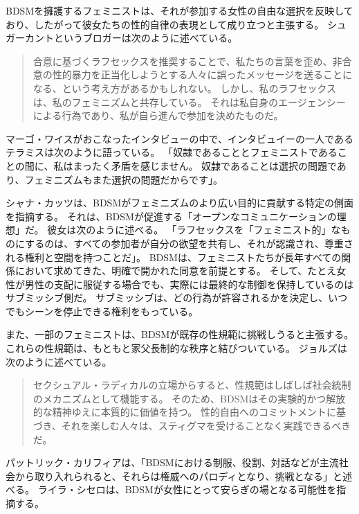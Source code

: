 \documentclass[paper=a4,book,openany]{jlreq} \usepackage{mystyle}
\begin{document}
BDSMを擁護するフェミニストは、それが参加する女性の自由な選択を反映しており、したがって彼女たちの性的自律の表現として成り立つと主張する。
シュガーカントというブロガーは次のように述べている。

\begin{quote}
合意に基づくラフセックスを推奨することで、私たちの言葉を歪め、非合意の性的暴力を正当化しようとする人々に誤ったメッセージを送ることになる、という考え方があるかもしれない。
しかし、私のラフセックスは、私のフェミニズムと共存している。
それは私自身のエージェンシーによる行為であり、私が自ら進んで参加を決めたものだ。
\citep{tallon-hicks16:_can_you_be_femin_like_rough_sex}

\end{quote}

マーゴ・ワイスがおこなったインタビューの中で、インタビュイーの一人であるテラミスは次のように語っている。
「奴隷であることとフェミニストであることの間に、私はまったく矛盾を感じません。
奴隷であることは選択の問題であり、フェミニズムもまた選択の問題だからです」\citep{weiss11:_techn_pleas}。

シャナ・カッツは、BDSMがフェミニズムのより広い目的に貢献する特定の側面を指摘する。
それは、BDSMが促進する「オープンなコミュニケーションの理想」だ。
彼女は次のように述べる。
「ラフセックスを「フェミニスト的」なものにするのは、すべての参加者が自分の欲望を共有し、それが認識され、尊重される権利と空間を持つことだ」\citep{tallon-hicks16:_can_you_be_femin_like_rough_sex}。
BDSMは、フェミニストたちが長年すべての関係において求めてきた、明確で開かれた同意を前提とする。
そして、たとえ女性が男性の支配に服従する場合でも、実際には最終的な制御を保持しているのはサブミッシブ側だ。
サブミッシブは、どの行為が許容されるかを決定し、いつでもシーンを停止できる権利をもっている。

また、一部のフェミニストは、BDSMが既存の性規範に挑戦しうると主張する。
これらの性規範は、もともと家父長制的な秩序と結びついている。
ジョルズは次のように述べている。

\begin{quote}
  セクシュアル・ラディカルの立場からすると、性規範はしばしば社会統制のメカニズムとして機能する。
そのため、BDSMはその実験的かつ解放的な精神ゆえに本質的に価値を持つ。
性的自由へのコミットメントに基づき、それを楽しむ人々は、スティグマを受けることなく実践できるべきだ。
\citep[p.268]{jolles15:_pleas_pain_femin_polit_rough_sex}

\end{quote}

パットリック・カリフィアは、「BDSMにおける制服、役割、対話などが主流社会から取り入れられると、それらは権威へのパロディとなり、挑戦となる」と述べる\citep{califia79:_unrav_sexual_fring}。
ライラ・シセロは、BDSMが女性にとって安らぎの場となる可能性を指摘する。
\end{document}
